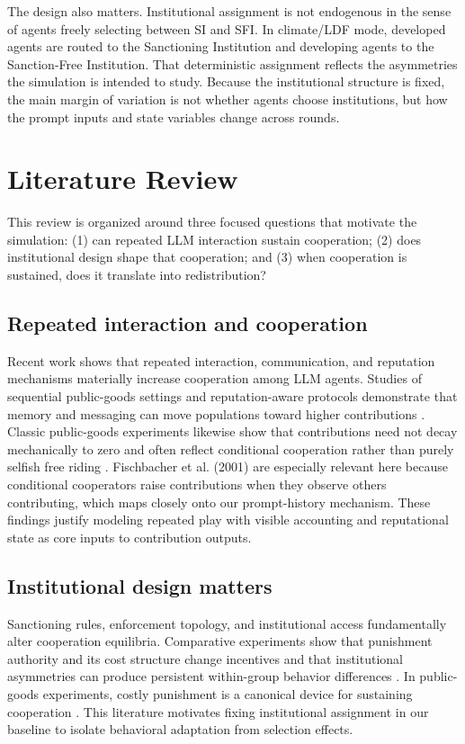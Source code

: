 \documentclass[12pt,letterpaper]{article}
\begin{document}
The design also matters. Institutional assignment is not endogenous in the sense of agents freely selecting between SI and SFI. In climate/LDF mode, developed agents are routed to the Sanctioning Institution and developing agents to the Sanction-Free Institution. That deterministic assignment reflects the asymmetries the simulation is intended to study. Because the institutional structure is fixed, the main margin of variation is not whether agents choose institutions, but how the prompt inputs and state variables change across rounds.

\section{Literature Review}

This review is organized around three focused questions that motivate the simulation: (1) can repeated LLM interaction sustain cooperation; (2) does institutional design shape that cooperation; and (3) when cooperation is sustained, does it translate into redistribution?

\subsection*{Repeated interaction and cooperation}
Recent work shows that repeated interaction, communication, and reputation mechanisms materially increase cooperation among LLM agents. Studies of sequential public-goods settings and reputation-aware protocols demonstrate that memory and messaging can move populations toward higher contributions \citep{piatti2024,liang2025,ren2025}. Classic public-goods experiments likewise show that contributions need not decay mechanically to zero and often reflect conditional cooperation rather than purely selfish free riding \citep{andreoni1988,fischbacher2001}. Fischbacher et al. (2001) are especially relevant here because conditional cooperators raise contributions when they observe others contributing, which maps closely onto our prompt-history mechanism. These findings justify modeling repeated play with visible accounting and reputational state as core inputs to contribution outputs.

\subsection*{Institutional design matters}
Sanctioning rules, enforcement topology, and institutional access fundamentally alter cooperation equilibria. Comparative experiments show that punishment authority and its cost structure change incentives and that institutional asymmetries can produce persistent within-group behavior differences \citep{warnakulasuriya2026,decurto2025,vezhnevets2023}. In public-goods experiments, costly punishment is a canonical device for sustaining cooperation \citep{fehrgachter2000,fehrgachter2002}. This literature motivates fixing institutional assignment in our baseline to isolate behavioral adaptation from selection effects.
\end{document}
